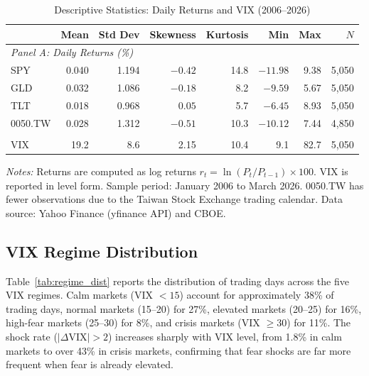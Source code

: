 \documentclass[12pt,a4paper]{article}
\begin{document}
\begin{table}[H]
\centering
\caption{Descriptive Statistics: Daily Returns and VIX (2006--2026)}
\label{tab:desc_stats}
\begin{threeparttable}
\begin{tabular}{lrrrrrrr}
\toprule
 & Mean & Std Dev & Skewness & Kurtosis & Min & Max & $N$ \\
\midrule
\multicolumn{8}{l}{\textit{Panel A: Daily Returns (\%)}} \\
SPY    & 0.040 & 1.194 & $-0.42$ & 14.8 & $-11.98$ & 9.38 & 5,050 \\
GLD    & 0.032 & 1.086 & $-0.18$ &  8.2 & $ -9.59$ & 5.67 & 5,050 \\
TLT    & 0.018 & 0.968 & $ 0.05$ &  5.7 & $ -6.45$ & 8.93 & 5,050 \\
0050.TW & 0.028 & 1.312 & $-0.51$ & 10.3 & $-10.12$ & 7.44 & 4,850 \\
\addlinespace
\multicolumn{8}{l}{\textit{Panel B: VIX Level}} \\
VIX    & 19.2 & 8.6 & 2.15 & 10.4 & 9.1 & 82.7 & 5,050 \\
\bottomrule
\end{tabular}
\begin{tablenotes}
\small
\item \textit{Notes:} Returns are computed as log returns $r_t = \ln(P_t/P_{t-1}) \times 100$. VIX is reported in level form. Sample period: January 2006 to March 2026. 0050.TW has fewer observations due to the Taiwan Stock Exchange trading calendar. Data source: Yahoo Finance (yfinance API) and CBOE.
\end{tablenotes}
\end{threeparttable}
\end{table}

\subsection{VIX Regime Distribution}

Table~\ref{tab:regime_dist} reports the distribution of trading days across the five VIX regimes. Calm markets (VIX $< 15$) account for approximately 38\% of trading days, normal markets (15--20) for 27\%, elevated markets (20--25) for 16\%, high-fear markets (25--30) for 8\%, and crisis markets (VIX $\geq 30$) for 11\%. The shock rate ($|\Delta\text{VIX}| > 2$) increases sharply with VIX level, from 1.8\% in calm markets to over 43\% in crisis markets, confirming that fear shocks are far more frequent when fear is already elevated.
\end{document}
